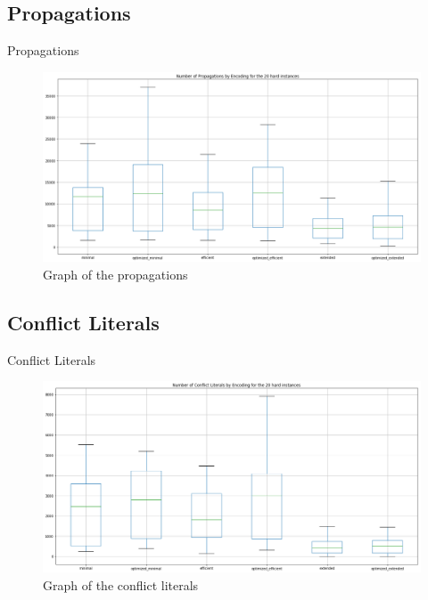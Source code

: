 \documentclass[11pt]{beamer}
\begin{document}
\subsection{Propagations}
\begin{frame}{Propagations}
\begin{figure}
\includegraphics[scale=0.25]{report/propagations}
\caption{Graph of the propagations}
\end{figure}
\end{frame}

\subsection{Conflict Literals}
\begin{frame}{Conflict Literals}
\begin{figure}
\includegraphics[scale=0.25]{report/conflict_literals}
\caption{Graph of the conflict literals}
\end{figure}
\end{frame}
\end{document}

